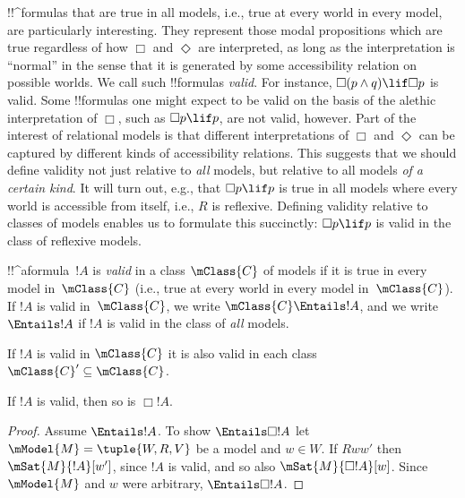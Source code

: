 \documentclass[../../../include/open-logic-section]{subfiles}
\begin{document}

\begin{explain}
  !!^{formula}s that are true in all models, i.e., true at every world
  in every model, are particularly interesting. They represent those
  modal propositions which are true regardless of how $\Box$ and
  $\Diamond$ are interpreted, as long as the interpretation is
  ``normal'' in the sense that it is generated by some accessibility
  relation on possible worlds. We call such !!{formula}s
  \emph{valid}. For instance, $\Box(p \land q) \lif \Box p$ is
  valid. Some !!{formula}s one might expect to be valid on the basis
  of the alethic interpretation of $\Box$, such as $\Box p \lif p$,
  are not valid, however.  Part of the interest of relational models
  is that different interpretations of $\Box$ and $\Diamond$ can be
  captured by different kinds of accessibility relations. This
  suggests that we should define validity not just relative to
  \emph{all} models, but relative to all models \emph{of a certain
    kind}. It will turn out, e.g., that $\Box p \lif p$ is true in all
  models where every world is accessible from itself, i.e., $R$ is
  reflexive. Defining validity relative to classes of models enables
  us to formulate this succinctly: $\Box p \lif p$ is valid in the
  class of reflexive models.
\end{explain}

\begin{defn}
  !!^a{formula}~$!A$ is \emph{valid} in a class $\mClass{C}$ of
  models if it is true in every model in~$\mClass{C}$ (i.e., true at
  every world in every model in~$\mClass{C}$). If $!A$ is valid
  in~$\mClass{C}$, we write $\mClass{C} \Entails !A$, and we
  write $\Entails !A$ if $!A$ is valid in the class of
  \emph{all} models.
\end{defn}

\begin{prop}
  If $!A$ is valid in $\mClass{C}$ it is also valid in each class
  $\mClass{C}' \subseteq \mClass{C}$.
\end{prop}

\begin{prop}
  If $!A$ is valid, then so is $\Box!A$. 
\end{prop}

\begin{proof}
  Assume $\Entails !A$. To show $\Entails \Box!A$ let $\mModel{M} =
  \tuple{W, R, V}$ be a model and $w \in W$. If $Rww'$ then
  $\mSat{M}{!A}[w']$, since $!A$ is valid, and so also
  $\mSat{M}{\Box!A}[w]$. Since $\mModel{M}$ and $w$ were
  arbitrary, $\Entails \Box!A$.
\end{proof}
\end{document}
